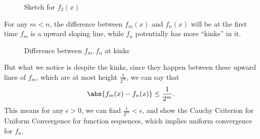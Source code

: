 {{\begin{figure}[H]
  \caption{Sketch for $f_2(x)$}
  \label{chap6:fig:plot_cantor_fx_2}
\end{figure}

\item For any $m < n$, the difference between $f_m(x)$ and $f_n(x)$
will be at the first time $f_m$ is a upward sloping line, while $f_n$
potentially has more ``kinks'' in it.
\begin{figure}[H]
  \centering
  \def\coordinateWidth{4}
  \def\tickWidth{2}
  \caption{Difference between $f_m, f_n$ at kinks}
  \label{chap6:fig:kink_diff}
\end{figure}
But what we notice is despite the kinks, since they happen between these 
upward lines of $f_m$, which are at most height $\frac{1}{2^m}$,
we can say that 
\begin{eqnarray}
  \abs{
    f_m(x) - f_n(x)
  } \leq \frac{1}{2^m}.
\end{eqnarray}
This means for any $\epsilon > 0$, we can find $\frac{1}{2^m} < \epsilon$,
and show the Cauchy Criterion for Uniform Convergence for function sequences,
which implies uniform convergence for $f_n$.

}}

